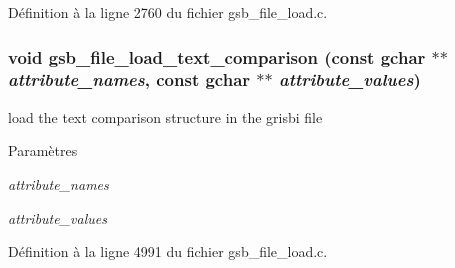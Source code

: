 Définition à la ligne 2760 du fichier gsb\_\-file\_\-load.c.

\subsubsection[{gsb\_\-file\_\-load\_\-text\_\-comparison}]{\setlength{\rightskip}{0pt plus 5cm}void gsb\_\-file\_\-load\_\-text\_\-comparison (const gchar $\ast$$\ast$ {\em attribute\_\-names}, \/  const gchar $\ast$$\ast$ {\em attribute\_\-values})}\label{gsb__file__load_8h_aa3a2441a09a865cecc43abf1606a4d1d}
load the text comparison structure in the grisbi file


\begin{DoxyParams}{Paramètres}
\item[{\em attribute\_\-names}]\item[{\em attribute\_\-values}]\end{DoxyParams}


Définition à la ligne 4991 du fichier gsb\_\-file\_\-load.c.

